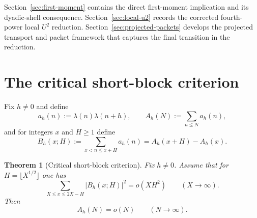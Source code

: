 \documentclass[11pt]{scrartcl}
\numberwithin{equation}{section}
\newtheorem{theorem}{Theorem}[section]
\theoremstyle{definition}
\newcommand{\1}{\mathbf 1}
\newcommand{\abs}[1]{\left|#1\right|}
\begin{document}
Section~\ref{sec:first-moment} contains the direct first-moment implication and its dyadic-shell consequence. Section~\ref{sec:local-u2} records the corrected fourth-power local $U^2$ reduction. Section~\ref{sec:projected-packets} develops the projected transport and packet framework that captures the final transition in the reduction.

\section{The critical short-block criterion}
\label{sec:short-block}

Fix $h\neq 0$ and define
\[
a_h(n):=\lambda(n)\lambda(n+h),
\qquad
A_h(N):=\sum_{n\le N}a_h(n),
\]
and for integers $x$ and $H\ge 1$ define
\[
B_h(x;H):=\sum_{x<n\le x+H}a_h(n)=A_h(x+H)-A_h(x).
\]

\begin{theorem}[Critical short-block criterion]
\label{thm:short-block-criterion}
Fix $h\neq 0$. Assume that for $H=\lfloor X^{1/2}\rfloor$ one has
\begin{equation}
\label{eq:short-block-criterion-hyp}
\sum_{X\le x\le 2X-H}\abs{B_h(x;H)}^2=o(XH^2)
\qquad (X\to\infty).
\end{equation}
Then
\begin{equation}
\label{eq:short-block-criterion-conc}
A_h(N)=o(N)
\qquad (N\to\infty).
\end{equation}
\end{theorem}
\end{document}
